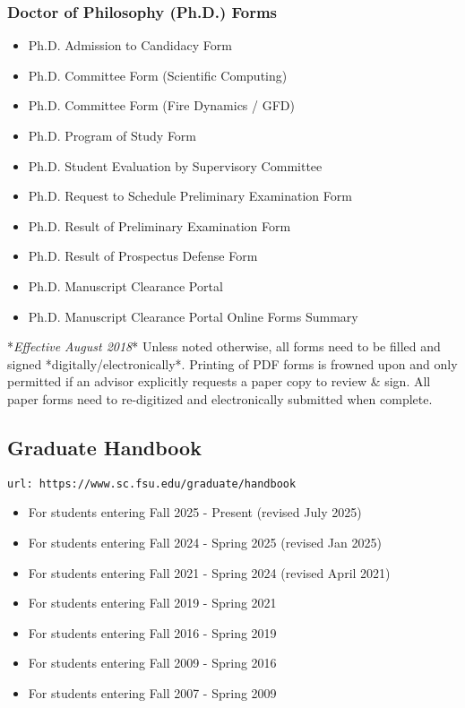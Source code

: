\documentclass[12pt,a4paper]{article}
\begin{document}
\subsubsection*{Doctor of Philosophy (Ph.D.) Forms}
\begin{itemize}
    \item Ph.D. Admission to Candidacy Form
    \item Ph.D. Committee Form (Scientific Computing)
    \item Ph.D. Committee Form (Fire Dynamics / GFD)
    \item Ph.D. Program of Study Form
    \item Ph.D. Student Evaluation by Supervisory Committee
    \item Ph.D. Request to Schedule Preliminary Examination Form
    \item Ph.D. Result of Preliminary Examination Form
    \item Ph.D. Result of Prospectus Defense Form
    \item Ph.D. Manuscript Clearance Portal
    \item Ph.D. Manuscript Clearance Portal Online Forms Summary
\end{itemize}

*\textit{Effective August 2018}* Unless noted otherwise, all forms need to be filled and signed *digitally/electronically*. Printing of PDF forms is frowned upon and only permitted if an advisor explicitly requests a paper copy to review \& sign. All paper forms need to re-digitized and electronically submitted when complete.

\subsection{Graduate Handbook}
\texttt{url: https://www.sc.fsu.edu/graduate/handbook}

\begin{itemize}
    \item For students entering Fall 2025 - Present (revised July 2025)
    \item For students entering Fall 2024 - Spring 2025 (revised Jan 2025)
    \item For students entering Fall 2021 - Spring 2024 (revised April 2021)
    \item For students entering Fall 2019 - Spring 2021
    \item For students entering Fall 2016 - Spring 2019
    \item For students entering Fall 2009 - Spring 2016
    \item For students entering Fall 2007 - Spring 2009
\end{itemize}
\end{document}
